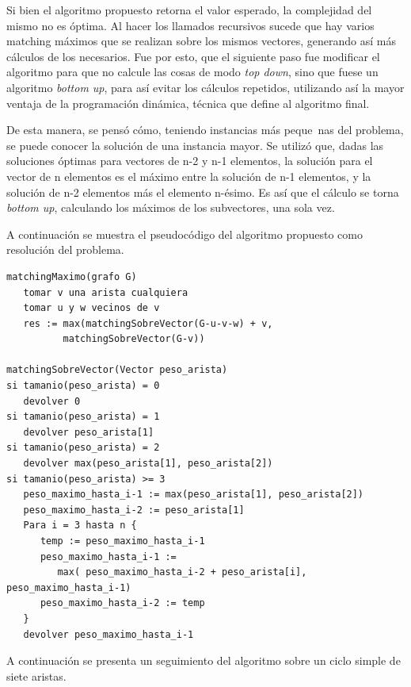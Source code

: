 \documentclass[a4paper, 12pt]{article}
\begin{document}
Si bien el algoritmo propuesto retorna el valor esperado, la complejidad del mismo no es óptima. Al hacer los llamados recursivos sucede que hay varios matching máximos que se realizan sobre los mismos vectores, generando así más cálculos de los necesarios. Fue por esto, que el siguiente paso fue modificar el algoritmo para que no calcule las cosas de modo \emph{top down}, sino que fuese un algoritmo \emph{bottom up}, para así evitar los cálculos repetidos, utilizando así la mayor ventaja de la programación dinámica, técnica que define al algoritmo final.

De esta manera, se pensó cómo, teniendo instancias más peque~{n}as del problema, se puede conocer la solución de una instancia mayor. Se utilizó que, dadas las soluciones óptimas para vectores de n-2 y n-1 elementos, la solución para el vector de n elementos es el máximo entre la solución de n-1 elementos, y la solución de n-2 elementos más el elemento n-ésimo. Es así que el cálculo se torna \emph{bottom up}, calculando los máximos de los subvectores, una sola vez.

A continuación se muestra el pseudocódigo del algoritmo propuesto como resolución del problema.


\begin{verbatim}
matchingMaximo(grafo G)
   tomar v una arista cualquiera
   tomar u y w vecinos de v
   res := max(matchingSobreVector(G-u-v-w) + v, 
          matchingSobreVector(G-v))

matchingSobreVector(Vector peso_arista)
si tamanio(peso_arista) = 0
   devolver 0
si tamanio(peso_arista) = 1
   devolver peso_arista[1]
si tamanio(peso_arista) = 2
   devolver max(peso_arista[1], peso_arista[2])
si tamanio(peso_arista) >= 3
   peso_maximo_hasta_i-1 := max(peso_arista[1], peso_arista[2]) 
   peso_maximo_hasta_i-2 := peso_arista[1]
   Para i = 3 hasta n {
      temp := peso_maximo_hasta_i-1
      peso_maximo_hasta_i-1 := 
         max( peso_maximo_hasta_i-2 + peso_arista[i], peso_maximo_hasta_i-1)
      peso_maximo_hasta_i-2 := temp
   }
   devolver peso_maximo_hasta_i-1

\end{verbatim}

A continuación se presenta un seguimiento del algoritmo sobre un ciclo simple de siete aristas.
\end{document}
